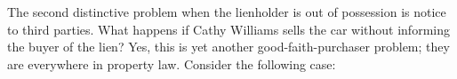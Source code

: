 \item The second distinctive problem when the lienholder is out of possession is
notice to third parties. What happens if Cathy Williams sells the car without
informing the buyer of the lien? Yes, this is yet another good-faith-purchaser
problem; they are everywhere in property law. Consider the following case:

